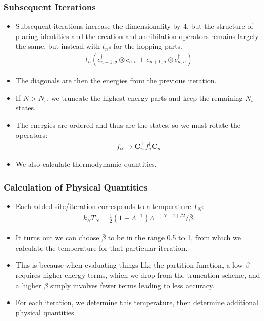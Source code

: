 \documentclass{beamer}
\newcommand{\vv}[1]{\mathbf{\bm{#1}}}
\begin{document}
\begin{frame}
  \frametitle{Subsequent Iterations}

  \begin{itemize}
  \item Subsequent iterations increase the dimensionality by 4, but the structure of placing identities and the creation and annihilation operators remains largely the same, but instead with $t_n$s for the hopping parts.
    \begin{gather*}
      t_n (c^\dagger_{n+1,\sigma} \otimes c_{n,\sigma} + c_{n+1,\sigma} \otimes c^\dagger_{n,\sigma})
    \end{gather*}
  \item The diagonals are then the energies from the previous iteration.
  \item If $N > N_s$, we truncate the highest energy parts and keep the remaining $N_s$ states.
  \item The energies are ordered and thus are the states, so we must rotate the operators:
    \begin{gather*}
      f^\dagger_\sigma \rightarrow \vv{C}_n^\intercal f^\dagger_\sigma \vv{C}_n
    \end{gather*}
  \item We also calculate thermodynamic quantities.
  \end{itemize}
\end{frame}


\begin{frame}
  \frametitle{Calculation of Physical Quantities}

  \begin{itemize}
  \item Each added site/iteration corresponds to a temperature $T_N$:
    \begin{gather*}
      k_B T_N = \frac{1}{2}(1 + \Lambda^{-1})\Lambda^{-(N-1)/2}/\bar{\beta}.
    \end{gather*}
  \item It turns out we can choose $\bar{\beta}$ to be in the range 0.5 to 1, from which we calculate the temperature for that particular iteration.
  \item This is because when evaluating things like the partition function, a low $\beta$ requires higher energy terms, which we drop from the truncation scheme, and a higher $\beta$ simply involves fewer terms leading to less accuracy.
  \item For each iteration, we determine this temperature, then determine additional physical quantities.
  \end{itemize}
\end{frame}
\end{document}
